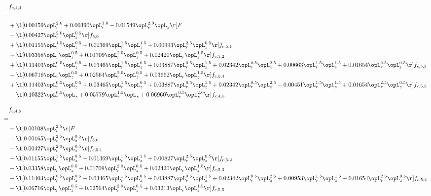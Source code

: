 \begin{alignat}{2} 
\label{eq:f_44_2} 
& f_{c,4,4} \nonumber \\ 
 = \\ 
& + \l[  0.00159 \opL_r^{2.0} +  0.00390 \opL_r^{3.0}   -0.01549 \opL_r^{2.0} \opL_z  \r] F \nonumber \\ 
& - \l[  0.00427 \opL_r^{2.0} \opL_z^{0.5}  \r] f_{5,0} \nonumber \\ 
& + \l[  0.01155 \opL_r^{1.5} \opL_z^{0.5} +  0.01369 \opL_r^{1.5} \opL_z^{1.5} +  0.00993 \opL_r^{2.5} \opL_z^{0.5}  \r] f_{c,5,1} \nonumber \\ 
& - \l[  0.03358 \opL_r \opL_z^{0.5} +  0.01709 \opL_r^{2.0} \opL_z^{0.5} +  0.02420 \opL_r \opL_z^{1.5}  \r] f_{c,5,2} \nonumber \\ 
& + \l[  0.11403 \opL_r^{0.5} \opL_z^{0.5} +  0.03465 \opL_r^{1.5} \opL_z^{0.5} +  0.03887 \opL_r^{0.5} \opL_z^{1.5} +  0.02342 \opL_r^{0.5} \opL_z^{2.5} +  0.00663 \opL_r^{1.5} \opL_z^{1.5} +  0.01654 \opL_r^{2.5} \opL_z^{0.5}  \r] f_{c,5,3} \nonumber \\ 
& - \l[  0.06716 \opL_r \opL_z^{0.5} +  0.02564 \opL_r^{2.0} \opL_z^{0.5} +  0.03662 \opL_r \opL_z^{1.5}  \r] f_{c,5,4} \nonumber \\ 
& + \l[  0.11403 \opL_r^{0.5} \opL_z^{0.5} +  0.03465 \opL_r^{1.5} \opL_z^{0.5} +  0.03887 \opL_r^{0.5} \opL_z^{1.5} +  0.02342 \opL_r^{0.5} \opL_z^{2.5}   -0.00451 \opL_r^{1.5} \opL_z^{1.5} +  0.01654 \opL_r^{2.5} \opL_z^{0.5}  \r] f_{c,5,5} \nonumber \\ 
& - \l[  0.10322 \opL_r^{0.5} \opL_z +  0.05779 \opL_r^{1.5} \opL_z +  0.06960 \opL_r^{0.5} \opL_z^{2.0}  \r] f_{c,4,5} \nonumber \\ 
\end{alignat} 


\begin{alignat}{2} 
\label{eq:f_45_2} 
& f_{c,4,5} \nonumber \\ 
 = \\ 
& - \l[  0.00108 \opL_r^{2.5}  \r] F \nonumber \\ 
& + \l[  0.00165 \opL_r^{2.5} \opL_z^{0.5}  \r] f_{5,0} \nonumber \\ 
& - \l[  0.00427 \opL_r^{2.0} \opL_z^{0.5}  \r] f_{c,5,1} \nonumber \\ 
& + \l[  0.01155 \opL_r^{1.5} \opL_z^{0.5} +  0.01369 \opL_r^{1.5} \opL_z^{1.5} +  0.00827 \opL_r^{2.5} \opL_z^{0.5}  \r] f_{c,5,2} \nonumber \\ 
& - \l[  0.03358 \opL_r \opL_z^{0.5} +  0.01709 \opL_r^{2.0} \opL_z^{0.5} +  0.02420 \opL_r \opL_z^{1.5}  \r] f_{c,5,3} \nonumber \\ 
& + \l[  0.11403 \opL_r^{0.5} \opL_z^{0.5} +  0.03465 \opL_r^{1.5} \opL_z^{0.5} +  0.03887 \opL_r^{0.5} \opL_z^{1.5} +  0.02342 \opL_r^{0.5} \opL_z^{2.5} +  0.00953 \opL_r^{1.5} \opL_z^{1.5} +  0.01654 \opL_r^{2.5} \opL_z^{0.5}  \r] f_{c,5,4} \nonumber \\ 
& - \l[  0.06716 \opL_r \opL_z^{0.5} +  0.02564 \opL_r^{2.0} \opL_z^{0.5} +  0.03213 \opL_r \opL_z^{1.5}  \r] f_{c,5,5} \nonumber \\ 
\end{alignat} 


